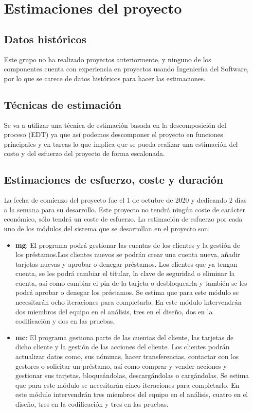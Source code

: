 \section{Estimaciones del proyecto}
\subsection{Datos históricos}
Este grupo no ha realizado proyectos anteriormente, y ninguno de los componentes
cuenta con experiencia en proyectos usando Ingenieríıa del Software, por lo que se carece
de datos históricos para hacer las estimaciones.
\subsection{Técnicas de estimación}
Se va a utilizar una técnica de estimación basada en la descomposición del proceso
(EDT) ya que así podemos descomponer el proyecto en funciones principales y en tareas
lo que implica que se pueda realizar una estimación del costo y del esfuerzo del proyecto
de forma escalonada.

\subsection{Estimaciones de esfuerzo, coste y duración}
La fecha de comienzo del proyecto fue el 1 de octubre de 2020 y dedicando 2 días a la semana para su desarrollo. Este proyecto no tendrá ningún coste de carácter económico, sólo tendrá un coste de esfuerzo. 
La estimación de esfuerzo por cada uno de los módulos del sistema que se desarrollan en el proyecto son:
\begin{itemize}
    \item \textbf{\gls{mg}}: El programa podrá gestionar las cuentas de los clientes  y la gestión de los préstamos.Los clientes nuevos se  podrán crear una cuenta nueva,  añadir tarjetas nuevas  y aprobar o denegar préstamos. Los clientes que ya tengan cuenta, se les podrá cambiar el titular, la clave de seguridad o eliminar la cuenta, así como cambiar el pin de la tarjeta o desbloquearla y también se les podrá aprobar o denegar los préstamos. Se estima que para este módulo se necesitarán ocho iteraciones para completarlo. En este módulo intervendrán dos miembros del equipo en el análisis, tres en el diseño, dos en la codificación y dos en las pruebas.
    \item \textbf{\gls{mc}}: El programa gestiona parte de las cuentas del cliente,  las tarjetas de dicho cliente y la gestión de las acciones del cliente. Los clientes podrán actualizar datos como, sus nóminas, hacer transferencias, contactar con los gestores o solicitar un préstamo, así como  comprar y vender acciones y gestionar sus tarjetas, bloqueándolas, descargándolas o cargándolas. Se estima que para este módulo se necesitarán cinco iteraciones para completarlo. En este módulo intervendrán tres miembros del equipo en el análisis, cuatro en el diseño, tres en la codificación y tres en las pruebas.
\end{itemize}
 
